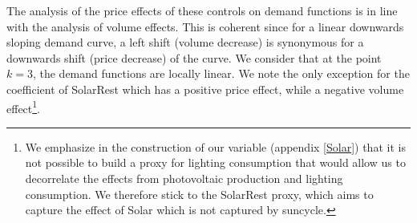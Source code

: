 The analysis of the price effects of these controls on demand functions is in line with the analysis of volume effects. This is coherent since for a linear downwards sloping demand curve, a left shift (volume decrease) is synonymous for a downwards shift (price decrease) of the curve. We consider that at the point $k=3$, the demand functions are locally linear. We note the only exception for the coefficient of SolarRest which has a positive price effect, while a negative volume effect\footnote{We emphasize in the construction of our variable (appendix \ref{Solar}) that it is not possible to build a proxy for lighting consumption that would allow us to decorrelate the effects from photovoltaic production and lighting consumption. We therefore stick to the SolarRest proxy, which aims to capture the effect of Solar which is not captured by suncycle.}. 

